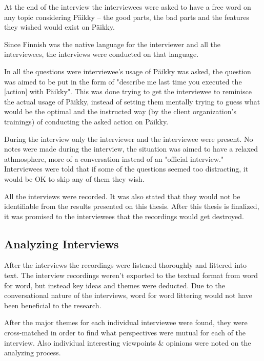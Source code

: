 At the end of the interview the interviewees were asked to have a free word on any topic considering Päikky – the good parts, the bad parts and the features they wished would exist on Päikky.

Since Finnish was the native language for the interviewer and all the interviewees, the interviews were conducted on that language.

In all the questions were interviewee's usage of Päikky was asked, the question was aimed to be put in the form of "describe me last time you executed the [action] with Päikky". This was done trying to get the interviewee to reminisce the actual usage of Päikky, instead of setting them mentally trying to guess what would be the optimal and the instructed way (by the client organization's trainings) of conducting the asked action on Päikky.

During the interview only the interviewer and the interviewee were present. No notes were made during the interview, the situation was aimed to have a relaxed athmosphere, more of a conversation instead of an "official interview." Interviewees were told that if some of the questions seemed too distracting, it would be OK to skip any of them they wish.

All the interviews were recorded.  It was also stated that they would not be identifiable from the results presented on this thesis. After this thesis is finalized, it was promised to the interviewees that the recordings would get destroyed.




\subsection{Analyzing Interviews}

After the interviews the recordings were listened thoroughly and littered into text. The interview recordings weren't exported to the textual format from word for word, but instead key ideas and themes were deducted. Due to the conversational nature of the interviews, word for word littering would not have been beneficial to the research. 

After the major themes for each individual interviewee were found, they were cross-matched in order to find what perspectives were mutual for each of the interview. Also individual interesting viewpoints & opinions were noted on the analyzing process.




